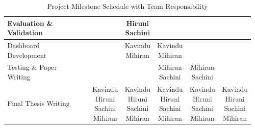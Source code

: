 ﻿\documentclass[12pt,a4paper]{article}
\begin{document}
\begin{table}[h]
{\begin{tabular}{|l|c|c|c|c|c|c|c|}
            Evaluation \& Validation & & & & \makecell{Hiruni \\ Sachini} & & & \\ \hline
            
            Dashboard Development & & & & \makecell{Kavindu \\ Mihiran} & \makecell{Kavindu \\ Mihiran} & & \\ \hline
            
            Testing \& Paper Writing & & & & & \makecell{Mihiran \\ Sachini} & \makecell{Mihiran \\ Sachini} & \\ \hline
            
            Final Thesis Writing & & & \makecell{Kavindu \\ Hiruni \\ Sachini \\ Mihiran} & \makecell{Kavindu \\ Hiruni \\ Sachini \\ Mihiran} & \makecell{Kavindu \\ Hiruni \\ Sachini \\ Mihiran} & \makecell{Kavindu \\ Hiruni \\ Sachini \\ Mihiran} & \makecell{Kavindu \\ Hiruni \\ Sachini \\ Mihiran} \\ \hline
        \end{tabular}%
    }
    \caption{Project Milestone Schedule with Team Responsibility}
\end{table}





\printbibliography
\end{document}
